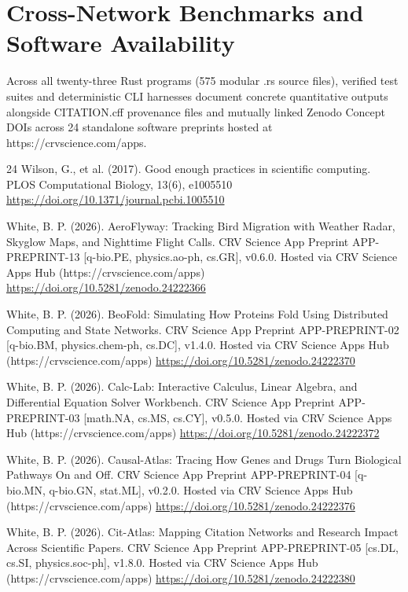 \documentclass[10pt,letterpaper]{article}
\begin{document}
\section{Cross-Network Benchmarks and Software Availability}
Across all twenty-three Rust programs (575 modular .rs source files), verified test suites and deterministic CLI harnesses document concrete quantitative outputs alongside CITATION.cff provenance files and mutually linked Zenodo Concept DOIs across 24 standalone software preprints hosted at https://crvscience.com/apps.

\begin{thebibliography}{24}
 Wilson, G., et al. (2017). Good enough practices in scientific computing. PLOS Computational Biology, 13(6), e1005510 \url{https://doi.org/10.1371/journal.pcbi.1005510}

 White, B. P. (2026). AeroFlyway: Tracking Bird Migration with Weather Radar, Skyglow Maps, and Nighttime Flight Calls. CRV Science App Preprint APP-PREPRINT-13 [q-bio.PE, physics.ao-ph, cs.GR], v0.6.0. Hosted via CRV Science Apps Hub (https://crvscience.com/apps) \url{https://doi.org/10.5281/zenodo.24222366}

 White, B. P. (2026). BeoFold: Simulating How Proteins Fold Using Distributed Computing and State Networks. CRV Science App Preprint APP-PREPRINT-02 [q-bio.BM, physics.chem-ph, cs.DC], v1.4.0. Hosted via CRV Science Apps Hub (https://crvscience.com/apps) \url{https://doi.org/10.5281/zenodo.24222370}

 White, B. P. (2026). Calc-Lab: Interactive Calculus, Linear Algebra, and Differential Equation Solver Workbench. CRV Science App Preprint APP-PREPRINT-03 [math.NA, cs.MS, cs.CY], v0.5.0. Hosted via CRV Science Apps Hub (https://crvscience.com/apps) \url{https://doi.org/10.5281/zenodo.24222372}

 White, B. P. (2026). Causal-Atlas: Tracing How Genes and Drugs Turn Biological Pathways On and Off. CRV Science App Preprint APP-PREPRINT-04 [q-bio.MN, q-bio.GN, stat.ML], v0.2.0. Hosted via CRV Science Apps Hub (https://crvscience.com/apps) \url{https://doi.org/10.5281/zenodo.24222376}

 White, B. P. (2026). Cit-Atlas: Mapping Citation Networks and Research Impact Across Scientific Papers. CRV Science App Preprint APP-PREPRINT-05 [cs.DL, cs.SI, physics.soc-ph], v1.8.0. Hosted via CRV Science Apps Hub (https://crvscience.com/apps) \url{https://doi.org/10.5281/zenodo.24222380}


\end{thebibliography}
\end{document}
